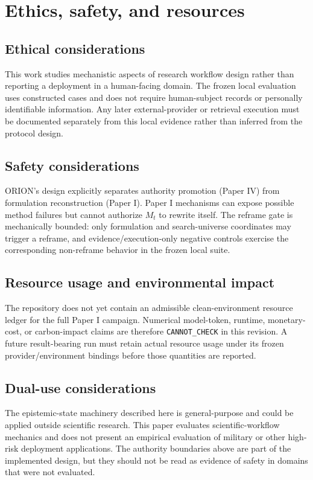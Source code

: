\section{Ethics, safety, and resources}

\subsection{Ethical considerations}
This work studies mechanistic aspects of research workflow design rather than reporting a deployment in a human-facing domain. The frozen local evaluation uses constructed cases and does not require human-subject records or personally identifiable information. Any later external-provider or retrieval execution must be documented separately from this local evidence rather than inferred from the protocol design.

\subsection{Safety considerations}
ORION's design explicitly separates authority promotion (Paper IV) from formulation reconstruction (Paper I). Paper I mechanisms can expose possible method failures but cannot authorize $M_t$ to rewrite itself. The reframe gate is mechanically bounded: only formulation and search-universe coordinates may trigger a reframe, and evidence/execution-only negative controls exercise the corresponding non-reframe behavior in the frozen local suite.

\subsection{Resource usage and environmental impact}
The repository does not yet contain an admissible clean-environment resource ledger for the full Paper I campaign. Numerical model-token, runtime, monetary-cost, or carbon-impact claims are therefore \texttt{CANNOT\_CHECK} in this revision. A future result-bearing run must retain actual resource usage under its frozen provider/environment bindings before those quantities are reported.

\subsection{Dual-use considerations}
The epistemic-state machinery described here is general-purpose and could be applied outside scientific research. This paper evaluates scientific-workflow mechanics and does not present an empirical evaluation of military or other high-risk deployment applications. The authority boundaries above are part of the implemented design, but they should not be read as evidence of safety in domains that were not evaluated.

